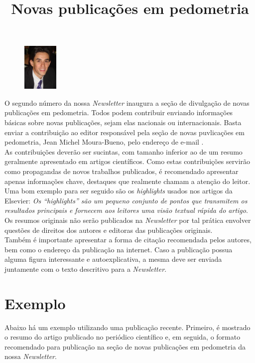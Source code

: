 \title{Novas publicações em pedometria}
\maketitle
\begin{figure}
\includegraphics[width=0.15\textwidth]{figuras/foto-jean}
\end{figure}
O segundo número da nossa \textit{Newsletter} inaugura a seção de divulgação de novas publicações em pedometria. Todos podem contribuir enviando informações básicas sobre novas publicações, sejam elas nacionais ou internacionais. Basta enviar a contribuição ao editor responsável pela seção de novas puvlicações em pedometria, Jean Michel Moura-Bueno, pelo endereço de e-mail .\\
As contribuições deverão ser sucintas, com tamanho inferior ao de um resumo geralmente apresentado em artigos científicos. Como estas contribuições servirão como propagandas de novos trabalhos publicados, é recomendado apresentar apenas informações chave, destaques que realmente chamam a atenção do leitor. Uma bom exemplo para ser seguido são os \emph{highlights} usados nos artigos da Elsevier: \emph{Os ``highlights'' são um pequeno conjunto de pontos que transmitem os resultados principais e fornecem aos leitores uma visão textual rápida do artigo}. Os resumos originais não serão publicados na \textit{Newsletter} por tal prática envolver questões de direitos dos autores e editoras das publicações originais.\\
Também é importante apresentar a forma de citação recomendada pelos autores, bem como o endereço da publicação na internet. Caso a publicação possua alguma figura interessante e autoexplicativa, a mesma deve ser enviada juntamente com o texto descritivo para a \textit{Newsletter}.
\section{Exemplo}
Abaixo há um exemplo utilizando uma publicação recente. Primeiro, é mostrado o resumo do artigo publicado no periódico científico e, em seguida, o formato recomendado para publicação na seção de novas publicações em pedometria da nossa \textit{Newsletter}.

